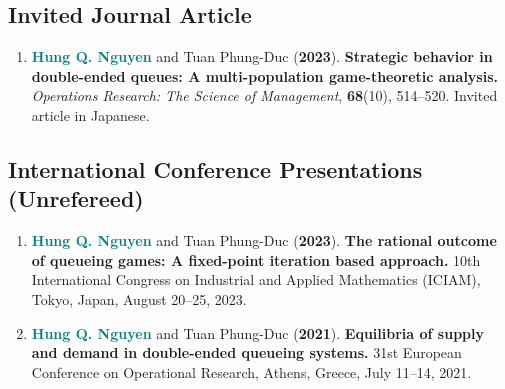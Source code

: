 \documentclass[10pt,a4paper]{article}
\newcommand{\myname}{\textbf{\textcolor{Teal}{Hung Q. Nguyen}}}
\newcommand{\papertitle}[1]{\textbf{#1}}
\newenvironment{publicationlist}{%
  \begin{enumerate}[
    label=\textcolor{Gold}{\bfseries\arabic*.},
    leftmargin=2.1em,
    labelsep=0.55em,
    itemsep=6pt,
    topsep=2pt,
    parsep=0pt,
    partopsep=0pt
  ]\small
}{\end{enumerate}}
\begin{document}
\subsection{Invited Journal Article}
\begin{publicationlist}
  \item \myname{} and Tuan Phung-Duc (\textbf{2023}). \papertitle{Strategic behavior in double-ended queues: A multi-population game-theoretic analysis.} \emph{Operations Research: The Science of Management}, \textbf{68}(10), 514--520. Invited article in Japanese.
\end{publicationlist}

\subsection{International Conference Presentations (Unrefereed)}
\begin{publicationlist}
  \item \myname{} and Tuan Phung-Duc (\textbf{2023}). \papertitle{The rational outcome of queueing games: A fixed-point iteration based approach.} 10th International Congress on Industrial and Applied Mathematics (ICIAM), Tokyo, Japan, August 20--25, 2023.

  \item \myname{} and Tuan Phung-Duc (\textbf{2021}). \papertitle{Equilibria of supply and demand in double-ended queueing systems.} 31st European Conference on Operational Research, Athens, Greece, July 11--14, 2021.
\end{publicationlist}
\end{document}
